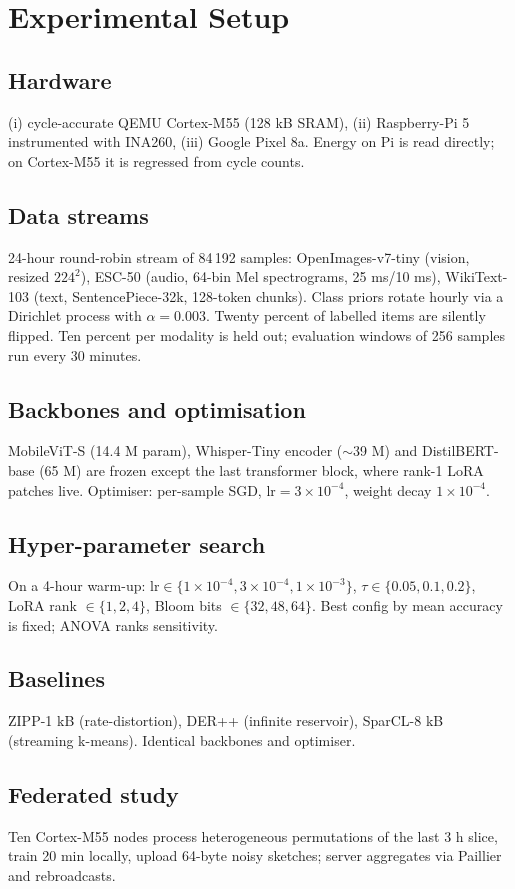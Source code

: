 \documentclass{article}
\begin{document}
\section{Experimental Setup}
\subsection{Hardware}
(i) cycle-accurate QEMU Cortex-M55 (128 kB SRAM), (ii) Raspberry-Pi 5 instrumented with INA260, (iii) Google Pixel 8a. Energy on Pi is read directly; on Cortex-M55 it is regressed from cycle counts.

\subsection{Data streams}
24-hour round-robin stream of 84\,192 samples: OpenImages-v7-tiny (vision, resized $224^2$), ESC-50 (audio, 64-bin Mel spectrograms, 25 ms/10 ms), WikiText-103 (text, SentencePiece-32k, 128-token chunks). Class priors rotate hourly via a Dirichlet process with $\alpha=0.003$. Twenty percent of labelled items are silently flipped. Ten percent per modality is held out; evaluation windows of 256 samples run every 30 minutes.

\subsection{Backbones and optimisation}
MobileViT-S (14.4 M param), Whisper-Tiny encoder ($\sim$39 M) and DistilBERT-base (65 M) are frozen except the last transformer block, where rank-1 LoRA patches live. Optimiser: per-sample SGD, $\mathrm{lr}=3\times 10^{-4}$, weight decay $1\times 10^{-4}$.

\subsection{Hyper-parameter search}
On a 4-hour warm-up: $\mathrm{lr}\in\{1\times 10^{-4},3\times 10^{-4},1\times 10^{-3}\}$, $\tau\in\{0.05,0.1,0.2\}$, LoRA rank $\in\{1,2,4\}$, Bloom bits $\in\{32,48,64\}$. Best config by mean accuracy is fixed; ANOVA ranks sensitivity.

\subsection{Baselines}
ZIPP-1 kB (rate-distortion), DER++ (infinite reservoir), SparCL-8 kB (streaming k-means). Identical backbones and optimiser.

\subsection{Federated study}
Ten Cortex-M55 nodes process heterogeneous permutations of the last 3 h slice, train 20 min locally, upload 64-byte noisy sketches; server aggregates via Paillier and rebroadcasts.
\end{document}

